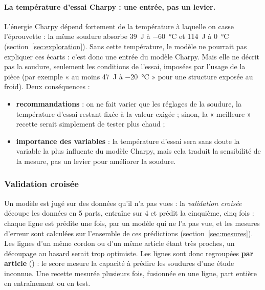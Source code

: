 \paragraph{La température d'essai Charpy : une entrée, pas un levier.} L'énergie Charpy
dépend fortement de la température à laquelle on casse l'éprouvette : la même soudure
absorbe \SI{39}{\joule} à \SI{-60}{\celsius} et \SI{114}{\joule} à \SI{0}{\celsius}
(section~\ref{sec:exploration}). Sans cette température, le modèle ne pourrait pas
expliquer ces écarts : c'est donc une entrée du modèle Charpy. Mais elle ne décrit pas la
soudure, seulement les conditions de l'essai, imposées par l'usage de la pièce (par
exemple « au moins \SI{47}{\joule} à \SI{-20}{\celsius} » pour une structure exposée au
froid). Deux conséquences :
\begin{itemize}
  \item \textbf{recommandations} : on ne fait varier que les réglages de la soudure,
    la température d'essai restant fixée à la valeur exigée ; sinon, la « meilleure »
    recette serait simplement de tester plus chaud ;
  \item \textbf{importance des variables} : la température d'essai sera sans doute la
    variable la plus influente du modèle Charpy, mais cela traduit la sensibilité de la
    mesure, pas un levier pour améliorer la soudure.
\end{itemize}


\subsubsection{Validation croisée}

Un modèle est jugé sur des données qu'il n'a pas vues : la \emph{validation croisée}
découpe les données en 5 parts, entraîne sur 4 et prédit la cinquième, cinq fois : chaque
ligne est prédite une fois, par un modèle qui ne l'a pas vue, et les mesures d'erreur sont
calculées sur l'ensemble de ces prédictions (section~\ref{sec:mesures}). Les lignes d'un même cordon ou d'un même article étant très proches,
un découpage au hasard serait trop optimiste. Les lignes sont donc regroupées
\textbf{par article} () : le score mesure la capacité à prédire les
soudures d'une étude inconnue. Une recette mesurée plusieurs fois, fusionnée en une ligne,
part entière en entraînement ou en test.

